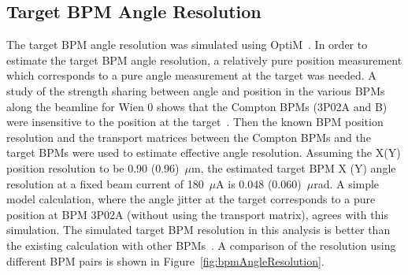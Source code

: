 \subsection{Target BPM Angle Resolution}
\label{Target BPM Angle Resolution}

The target BPM angle resolution was simulated using OptiM~\cite{OPTIM}. 
In order to estimate the target BPM angle resolution, a relatively pure position measurement which corresponds to a pure angle measurement at the target was needed. 
A study of the strength sharing between angle and position in the various BPMs along the beamline for Wien 0 shows that the Compton BPMs (3P02A and B) were insensitive to the position at the target~\cite{presentation:nur_BPMAngleResolution_1779}. Then the known BPM position resolution and the transport matrices between the Compton BPMs and the target BPMs were used to estimate effective angle resolution. 
Assuming the X(Y) position resolution to be 0.90 (0.96)~$\mu$m, the estimated target BPM X (Y) angle resolution at a fixed beam current of 180~$\mu$A is 0.048 (0.060)~$\mu$rad.
%
%
%
A simple model calculation, where the angle jitter at the target corresponds to a pure position at BPM 3P02A (without using the transport matrix), agrees with this simulation. 
The simulated target BPM resolution in this analysis is better than the existing calculation with other BPMs~\cite{presentation:mack_Wien0MDSensitivities_1776}. A comparison of the resolution using different BPM pairs is shown in Figure~\ref{fig:bpmAngleResolution}.

